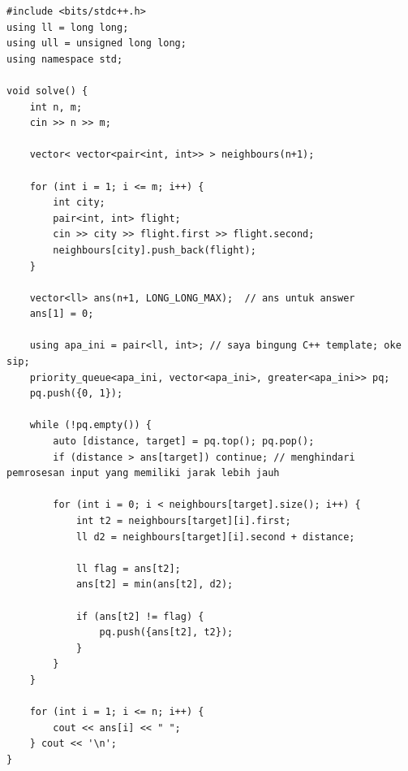 \documentclass{article}
\begin{document}
\begin{lstlisting}
#include <bits/stdc++.h>
using ll = long long;
using ull = unsigned long long;
using namespace std;

void solve() {
    int n, m;
    cin >> n >> m;
    
    vector< vector<pair<int, int>> > neighbours(n+1);

    for (int i = 1; i <= m; i++) {
        int city;
        pair<int, int> flight;
        cin >> city >> flight.first >> flight.second;
        neighbours[city].push_back(flight);
    }

    vector<ll> ans(n+1, LONG_LONG_MAX);  // ans untuk answer
    ans[1] = 0;

    using apa_ini = pair<ll, int>; // saya bingung C++ template; oke sip;
    priority_queue<apa_ini, vector<apa_ini>, greater<apa_ini>> pq;
    pq.push({0, 1});

    while (!pq.empty()) {
        auto [distance, target] = pq.top(); pq.pop();
        if (distance > ans[target]) continue; // menghindari pemrosesan input yang memiliki jarak lebih jauh

        for (int i = 0; i < neighbours[target].size(); i++) {
            int t2 = neighbours[target][i].first; 
            ll d2 = neighbours[target][i].second + distance; 

            ll flag = ans[t2];
            ans[t2] = min(ans[t2], d2);

            if (ans[t2] != flag) {
                pq.push({ans[t2], t2});
            }
        }
    }

    for (int i = 1; i <= n; i++) {
        cout << ans[i] << " ";
    } cout << '\n';
}
\end{lstlisting}
\end{document}
